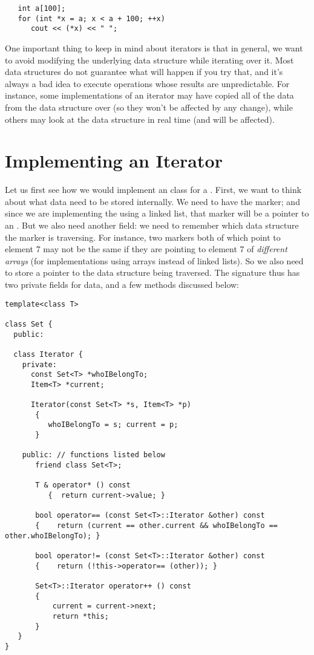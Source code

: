 \begin{verbatim}
   int a[100];
   for (int *x = a; x < a + 100; ++x)
      cout << (*x) << " ";
\end{verbatim}

One important thing to keep in mind about iterators is that in
general, we want to avoid modifying the underlying data structure
while iterating over it. Most data structures do not guarantee what
will happen if you try that, and it's always a bad idea to execute
operations whose results are unpredictable.
For instance, some implementations of an iterator may have copied all
of the data from the data structure over (so they won't be affected by
any change), while others may look at the data structure in real time
(and will be affected).

\section{Implementing an Iterator}
Let us first see how we would implement an  class for a
.
First, we want to think about what data need to be stored internally.
We need to have the marker; and since we are implementing the
 using a linked list, that marker will be a pointer to an
.
But we also need another field: we need to remember which data
structure the marker is traversing. For instance, two markers both of
which point to element 7 may not be the same if they are pointing to
element 7 of \emph{different arrays} (for implementations using
arrays instead of linked lists). So we also need to store a
pointer to the data structure being traversed.
The signature thus has two private fields for data, and a few methods
discussed below:
\begin{verbatim}
template<class T>

class Set { 
  public:

  class Iterator {
    private:
      const Set<T> *whoIBelongTo;
      Item<T> *current;

      Iterator(const Set<T> *s, Item<T> *p)
       {
          whoIBelongTo = s; current = p;
       }

    public: // functions listed below
       friend class Set<T>;

       T & operator* () const
          {  return current->value; }

       bool operator== (const Set<T>::Iterator &other) const
       {    return (current == other.current && whoIBelongTo == other.whoIBelongTo); }

       bool operator!= (const Set<T>::Iterator &other) const
       {    return (!this->operator== (other)); }

       Set<T>::Iterator operator++ () const
       { 
           current = current->next;
           return *this; 
       }
   }
}
\end{verbatim}

